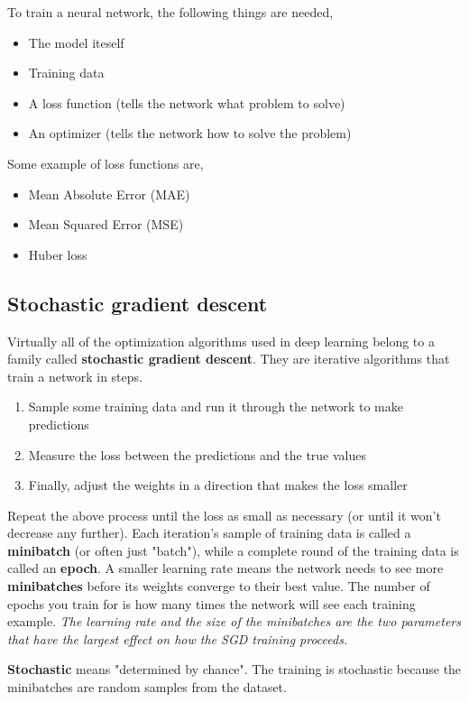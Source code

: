 \noindent To train a neural network, the following things are needed,
\begin{itemize}
	\item The model iteself
	\item Training data
	\item A loss function (tells the network what problem to solve)
	\item An optimizer (tells the network how to solve the problem)
\end{itemize}

\noindent Some example of loss functions are,
\begin{itemize}
	\item Mean Absolute Error (MAE)
	\item Mean Squared Error (MSE)
	\item Huber loss
\end{itemize}

\subsection{Stochastic gradient descent}
\noindent Virtually all of the optimization algorithms used in deep learning
belong to a family called \textbf{stochastic gradient descent}. They are
iterative algorithms that train a network in steps.
\begin{enumerate}
	\item Sample some training data and run it through the network to make
		predictions
	\item Measure the loss between the predictions and the true values
	\item Finally, adjust the weights in a direction that makes the loss smaller
\end{enumerate}

\noindent Repeat the above process until the loss as small as necessary (or until
it won't decrease any further). Each iteration's sample of training data is called
a \textbf{minibatch} (or often just "batch"), while a complete round of the training data
is called an \textbf{epoch}. A smaller learning rate means the network needs to see
more \textbf{minibatches} before its weights converge to their best value.
The number of epochs you train for is how many times the network will see each
training example. \emph{The learning rate and the size of the minibatches are the two
parameters that have the largest effect on how the SGD training proceeds.}

\noindent \textbf{Stochastic} means "determined by chance". The training is stochastic
because the minibatches are random samples from the dataset.

